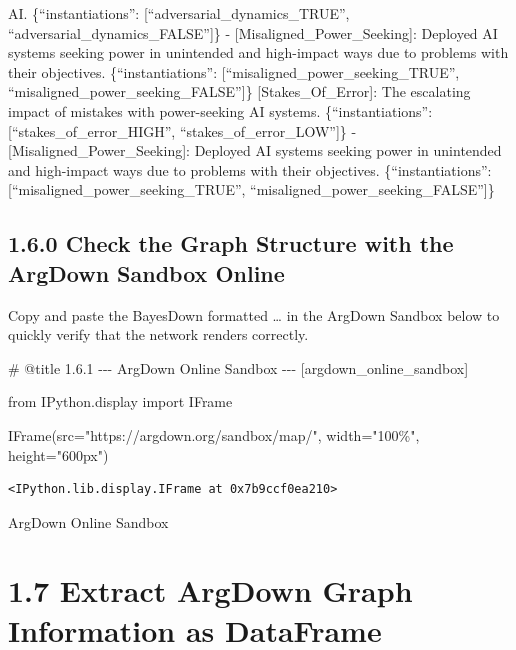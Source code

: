 \documentclass[
  11pt,
  letterpaper,
]{book}
\newenvironment{Shaded}{\begin{snugshade}}{\end{snugshade}}
\newcommand{\CommentTok}[1]{\textcolor[rgb]{0.37,0.37,0.37}{#1}}
\newcommand{\ImportTok}[1]{\textcolor[rgb]{0.00,0.46,0.62}{#1}}
\newcommand{\NormalTok}[1]{\textcolor[rgb]{0.00,0.23,0.31}{#1}}
\newcommand{\OperatorTok}[1]{\textcolor[rgb]{0.37,0.37,0.37}{#1}}
\newcommand{\StringTok}[1]{\textcolor[rgb]{0.13,0.47,0.30}{#1}}
\begin{document}
AI. \{``instantiations'': {[}``adversarial\_dynamics\_TRUE'',
``adversarial\_dynamics\_FALSE''{]}\} -
{[}Misaligned\_Power\_Seeking{]}: Deployed AI systems seeking power in
unintended and high-impact ways due to problems with their objectives.
\{``instantiations'': {[}``misaligned\_power\_seeking\_TRUE'',
``misaligned\_power\_seeking\_FALSE''{]}\} {[}Stakes\_Of\_Error{]}: The
escalating impact of mistakes with power-seeking AI systems.
\{``instantiations'': {[}``stakes\_of\_error\_HIGH'',
``stakes\_of\_error\_LOW''{]}\} - {[}Misaligned\_Power\_Seeking{]}:
Deployed AI systems seeking power in unintended and high-impact ways due
to problems with their objectives. \{``instantiations'':
{[}``misaligned\_power\_seeking\_TRUE'',
``misaligned\_power\_seeking\_FALSE''{]}\}

\subsection{1.6.0 Check the Graph Structure with the ArgDown Sandbox
Online}\label{check-the-graph-structure-with-the-argdown-sandbox-online}

Copy and paste the BayesDown formatted \ldots{} in the ArgDown Sandbox
below to quickly verify that the network renders correctly.

\begin{Shaded}
\begin{Highlighting}[]
\CommentTok{\# @title 1.6.1 {-}{-}{-} ArgDown Online Sandbox {-}{-}{-} [argdown\_online\_sandbox]}

\ImportTok{from}\NormalTok{ IPython.display }\ImportTok{import}\NormalTok{ IFrame}

\NormalTok{IFrame(src}\OperatorTok{=}\StringTok{"https://argdown.org/sandbox/map/"}\NormalTok{, width}\OperatorTok{=}\StringTok{"100\%"}\NormalTok{, height}\OperatorTok{=}\StringTok{"600px"}\NormalTok{)}
\end{Highlighting}
\end{Shaded}

\label{argdown_online_sandbox}
\begin{verbatim}
<IPython.lib.display.IFrame at 0x7b9ccf0ea210>
\end{verbatim}

ArgDown Online Sandbox

\section{1.7 Extract ArgDown Graph Information as
DataFrame}\label{extract-argdown-graph-information-as-dataframe}
\end{document}
